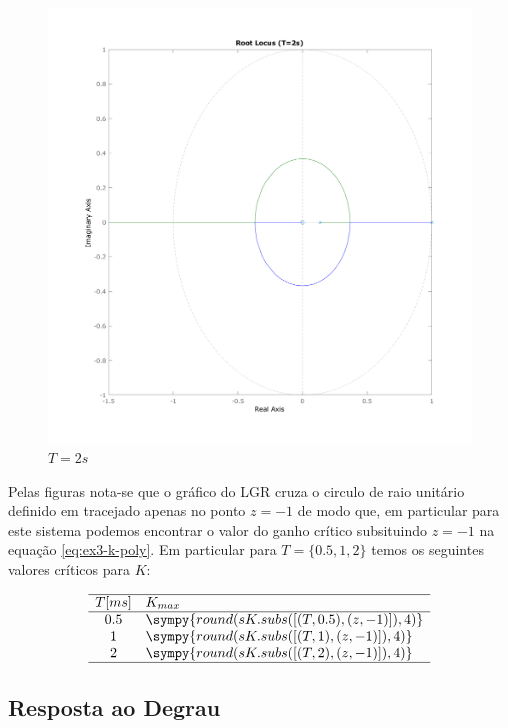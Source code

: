 \documentclass[a4paper,11pt]{article}
\newcommand{\npy}[1]{\sympy{round(#1,4)}}
\begin{document}
\begin{figure}[H]
    \centering
    \includegraphics[width=0.9\linewidth]{img/exsim3-rlocus-t2000ms.png}
    \caption{ $T=2s$}
\end{figure}

Pelas figuras nota-se que o gráfico do LGR cruza o circulo de raio unitário definido em tracejado apenas no ponto $z=-1$ de modo que, em particular para este sistema podemos encontrar o valor do ganho crítico subsituindo $z=-1$ na equação \ref{eq:ex3-k-poly}. Em particular para $T=\{0.5,1,2\}$ temos os seguintes valores críticos para $K$:

\begin{table}[H]
    \centering
    $$
    \begin{array}{cl}
        \hline
        T [ms] & K_{max} \\
        \hline
        0.5 & \npy{sK.subs([(T,0.5),(z,-1)])}\\
        1 & \npy{sK.subs([(T,1),(z,-1)])}\\
        2 & \npy{sK.subs([(T,2),(z,-1)])}\\
        \hline
    \end{array}
    $$
\end{table}

\subsection{Resposta ao Degrau} 
\end{document}
